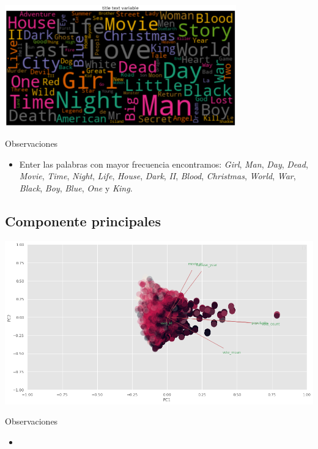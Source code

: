 \documentclass[11pt,a4paper,twoside]{thesis}
\begin{document}
\begin{center}
	\includegraphics[width=10cm]{./images/Cloud-Title.png}
\end{center}
\begin{description}
	\item[Observaciones]
\end{description}
\begin{itemize}
	\item Enter las palabras con mayor frecuencia encontramos: \textit{Girl}, \textit{Man}, \textit{Day}, \textit{Dead}, \textit{Movie}, \textit{Time}, \textit{Night}, \textit{Life}, \textit{House}, \textit{Dark}, \textit{II}, \textit{Blood}, \textit{Christmas}, \textit{World}, \textit{War}, \textit{Black}, \textit{Boy}, \textit{Blue}, \textit{One} y \textit{King}.
\end{itemize}


\subsection{Componente principales}


\begin{center}
	\includegraphics[width=15cm]{./images/PCA-biplot.png}
\end{center}
\begin{description}
	\item[Observaciones]
\end{description}
\begin{itemize}
	\item 
\end{itemize}
\end{document}
